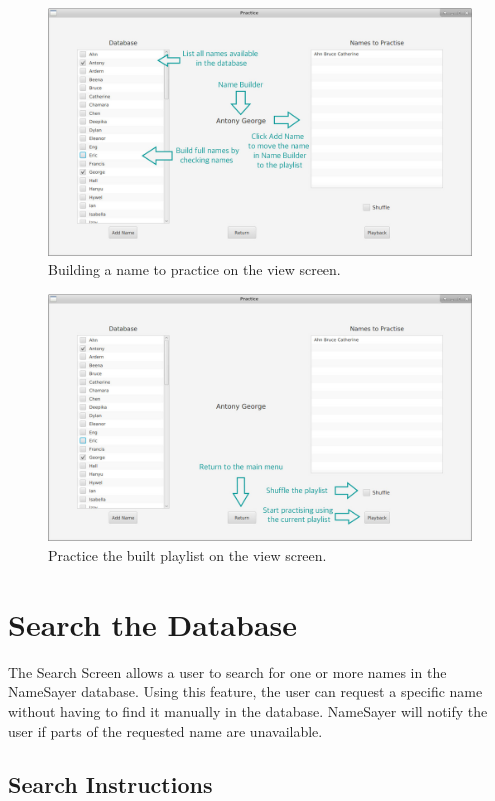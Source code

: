 \documentclass{article}
\begin{document}
\begin{figure}[H]
	\includegraphics[width=\textwidth]{images/2_view_build.jpg}
	\caption{Building a name to practice on the view screen.}
	\label{viewbuild}
\end{figure}


\begin{figure}[H]
	\includegraphics[width=\textwidth]{images/3_view_play.jpg}
	\caption{Practice the built playlist on the view screen.}
	\label{viewplay}
\end{figure}


\section{Search the Database}
The Search Screen allows a user to search for one or more names in the NameSayer
database. Using this feature, the user can request a specific name without
having to find it manually in the database. NameSayer will notify the user if
parts of the requested name are unavailable.

\subsection{Search Instructions}
\end{document}
